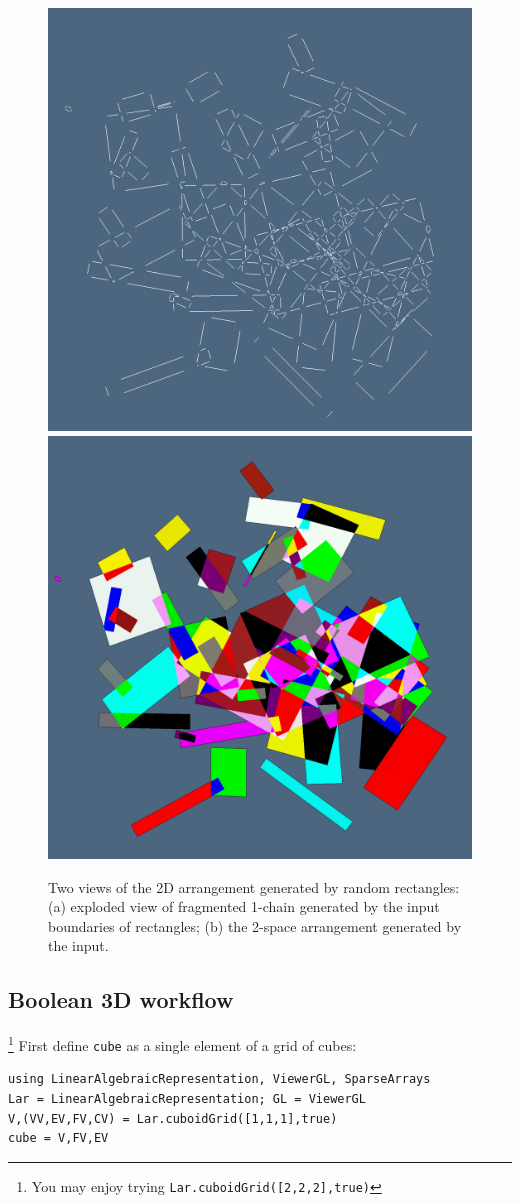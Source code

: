 \documentclass{juliacon}
\begin{document}
\begin{figure}[htb] %
   \centering
   \includegraphics[width=0.5\linewidth]{figs/squares1.png}%
   \includegraphics[width=0.5\linewidth]{figs/squares2.png}
   
   \caption{Two views of the 2D arrangement generated by random rectangles:
   (a) exploded view of fragmented 1-chain generated by the input boundaries of rectangles; 
   (b) the 2-space arrangement generated by the input.}
   \label{fig:example}
\end{figure}



\subsection{Boolean 3D workflow}\label{sec:boolean}\footnote{You may enjoy trying \texttt{Lar.cuboidGrid([2,2,2],true)}}
First define \texttt{cube} as a single element of a grid of cubes:

{\footnotesize\begin{verbatim}
using LinearAlgebraicRepresentation, ViewerGL, SparseArrays
Lar = LinearAlgebraicRepresentation; GL = ViewerGL
V,(VV,EV,FV,CV) = Lar.cuboidGrid([1,1,1],true)
cube = V,FV,EV
\end{verbatim}}
\end{document}
